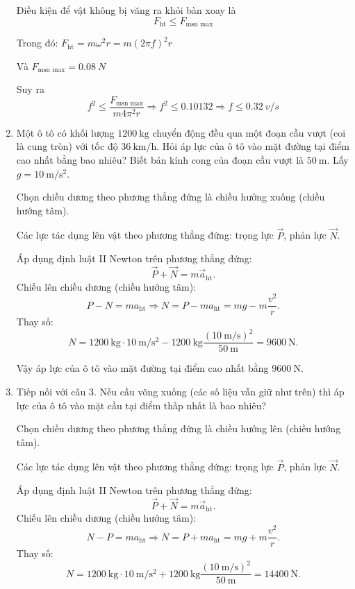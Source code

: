 \begin{enumerate}[label=\bfseries Câu \arabic*:]
	\hideall
	{	
		Điều kiện để vật không bị văng ra khỏi bàn xoay là
		$$F_\text{ht} \leq F_\text{msn max}$$
		
		Trong đó: $F_\text{ht} = m\omega^2 r = m (2\pi f)^2 r$
		
		Và $F_\text{msn max} = \SI{0.08}{N}$
		
		Suy ra $$f^2 \leq \dfrac{F_\text{msn max}}{m 4 \pi ^2 r} \Rightarrow f^2 \leq {0.10132} \Rightarrow f\leq \SI{0.32}{v/s}$$
	}
	\item {}
	
	
	{
		Một ô tô có khối lượng $\SI{1200}{\kilogram}$ chuyển động đều qua một đoạn cầu vượt (coi là cung tròn) với tốc độ $\SI{36}{\kilo \meter / \hour}$. Hỏi áp lực của ô tô vào mặt đường tại điểm cao nhất bằng bao nhiêu? Biết bán kính cong của đoạn cầu vượt là $\SI{50}{\meter}$. Lấy $g=\SI{10}{\meter / \second ^2}$.
	}
	
	\hideall
	{	
		Chọn chiều dương theo phương thẳng đứng là chiều hướng xuống (chiều hướng tâm).
		
		Các lực tác dụng lên vật theo phương thẳng đứng: trọng lực $\vec P$, phản lực $\vec N$.
		
		Áp dụng định luật II Newton trên phương thẳng đứng:
		$$\vec P + \vec N = m \vec a_\text{ht}.$$
		Chiếu lên chiều dương (chiều hướng tâm):
		$$P-N=ma_\text {ht} \Rightarrow N=P-ma_\text{ht} = mg - m \dfrac{v^2}{r}.$$
		Thay số:
		$$N=\SI{1200}{\kilogram} \cdot \SI{10}{\meter / \second ^2} - \SI{1200}{\kilogram} \dfrac{(\SI{10}{\meter / \second})^2}{\SI{50}{\meter}} = \SI{9600}{\newton}.$$
		
		Vậy áp lực của ô tô vào mặt đường tại điểm cao nhất bằng $\SI{9600}{\newton}$.
	}
	\item {}
	
	
	{
		Tiếp nối với câu 3. Nếu cầu võng xuống (các số liệu vẫn giữ như trên) thì áp lực của ô tô vào mặt cầu tại điểm thấp nhất là bao nhiêu?
	}
	
	\hideall
	{	
		Chọn chiều dương theo phương thẳng đứng là chiều hướng lên (chiều hướng tâm).
		
		Các lực tác dụng lên vật theo phương thẳng đứng: trọng lực $\vec P$, phản lực $\vec N$.
		
		Áp dụng định luật II Newton trên phương thẳng đứng:
		$$\vec P + \vec N = m \vec a_\text{ht}.$$
		Chiếu lên chiều dương (chiều hướng tâm):
		$$N-P=ma_\text {ht} \Rightarrow N=P+ma_\text{ht} = mg + m \dfrac{v^2}{r}.$$
		Thay số:
		$$N=\SI{1200}{\kilogram} \cdot \SI{10}{\meter / \second ^2} + \SI{1200}{\kilogram} \dfrac{(\SI{10}{\meter / \second})^2}{\SI{50}{\meter}} = \SI{14400}{\newton}.$$
		
}
\end{enumerate}
